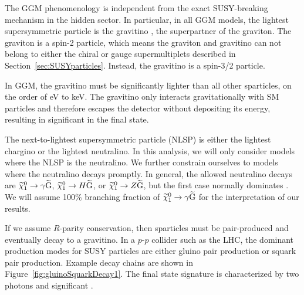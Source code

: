 The GGM phenomenology is independent from the exact SUSY-breaking mechanism in the hidden sector. In particular, 
in all GGM models, the lightest supersymmetric particle is the gravitino \gravitino, the superpartner of the graviton. 
The graviton is a spin-2 particle, which means the graviton and gravitino can not belong to either the chiral or gauge supermultiplets described in Section~\ref{sec:SUSYparticles}. Instead, the gravitino is a spin-3/2 particle.

In GGM, the gravitino must be significantly lighter than all other sparticles, on the order of eV to keV. The gravitino only interacts
gravitationally with SM particles and therefore escapes the detector without depositing its energy, resulting in 
significant \ETmiss in the final state.

The next-to-lightest supersymmetric particle (NLSP) is either the lightest chargino or the lightest neutralino.
In this analysis, we will only consider models where the NLSP is the neutralino. We further constrain 
ourselves to models where the neutralino decays promptly. In general, the allowed neutralino decays are
$\widetilde{\chi}^{0}_{1} \rightarrow \gamma\widetilde{\mathrm{G}}$, $\widetilde{\chi}^{0}_{1} \rightarrow H\widetilde{\mathrm{G}}$, or $\widetilde{\chi}^{0}_{1} \rightarrow Z\widetilde{\mathrm{G}}$,
but the first case normally dominates \cite{searchGMSB}. We will assume 100\% branching fraction of $\widetilde{\chi}^{0}_{1} \rightarrow \gamma\widetilde{\mathrm{G}}$
for the interpretation of our results.

If we assume $R$-parity conservation, then sparticles must be pair-produced and eventually decay to a gravitino. 
In a $p$-$p$ collider such as the LHC, the dominant production modes for SUSY particles are either gluino pair production
or squark pair production. Example decay chains are shown in Figure~\ref{fig:gluinoSquarkDecay1}. The final state 
signature is characterized by two photons and significant \ETmiss.

